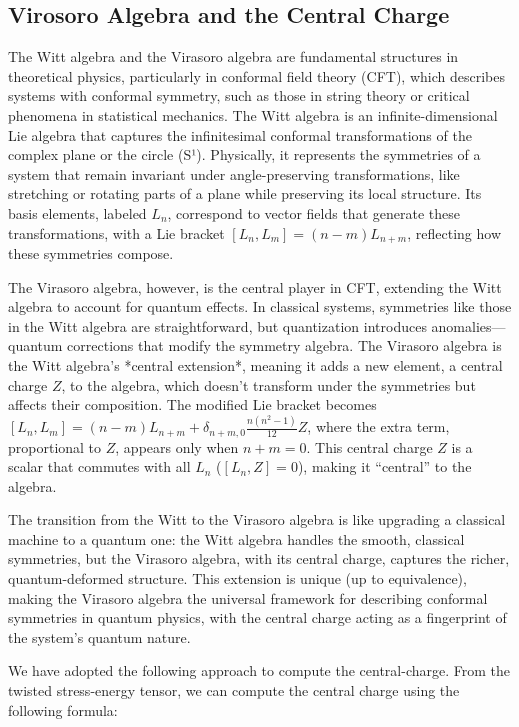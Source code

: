 \subsection{Virosoro Algebra and the Central Charge}
\label{subsection:central-charge}
The Witt algebra and the Virasoro algebra are fundamental structures in theoretical physics, particularly in conformal field theory (CFT), which describes systems with conformal symmetry, such as those in string theory or critical phenomena in statistical mechanics. The Witt algebra is an infinite-dimensional Lie algebra that captures the infinitesimal conformal transformations of the complex plane or the circle (S¹). Physically, it represents the symmetries of a system that remain invariant under angle-preserving transformations, like stretching or rotating parts of a plane while preserving its local structure. Its basis elements, labeled \(L_n\), correspond to vector fields that generate these transformations, with a Lie bracket \([L_n, L_m] = (n - m)L_{n+m}\), reflecting how these symmetries compose.

The Virasoro algebra, however, is the central player in CFT, extending the Witt algebra to account for quantum effects. In classical systems, symmetries like those in the Witt algebra are straightforward, but quantization introduces anomalies—quantum corrections that modify the symmetry algebra. The Virasoro algebra is the Witt algebra's *central extension*, meaning it adds a new element, a central charge \(Z\), to the algebra, which doesn’t transform under the symmetries but affects their composition. The modified Lie bracket becomes \([L_n, L_m] = (n - m)L_{n+m} + \delta_{n+m,0} \frac{n(n^2 - 1)}{12} Z\), where the extra term, proportional to \(Z\), appears only when \(n + m = 0\). This central charge \(Z\) is a scalar that commutes with all \(L_n\) (\([L_n, Z] = 0\)), making it “central” to the algebra.

The transition from the Witt to the Virasoro algebra is like upgrading a classical machine to a quantum one: the Witt algebra handles the smooth, classical symmetries, but the Virasoro algebra, with its central charge, captures the richer, quantum-deformed structure. This extension is unique (up to equivalence), making the Virasoro algebra the universal framework for describing conformal symmetries in quantum physics, with the central charge acting as a fingerprint of the system’s quantum nature.

We have adopted the following approach to compute the central-charge. From the twisted stress-energy tensor, we can compute the central charge using the following formula:


